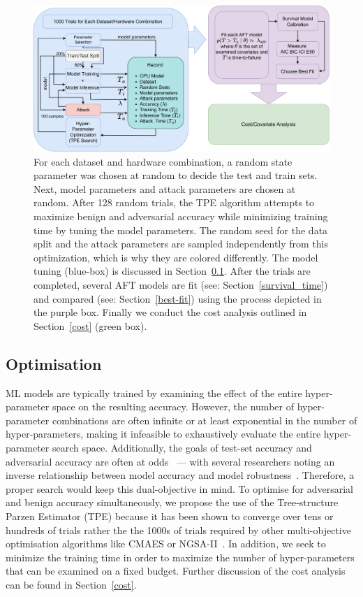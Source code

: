 \documentclass[conference]{IEEEtran}
\begin{document}
\begin{figure}
    \centering
    \includegraphics[width=\textwidth]{plots/experiment.pdf}
    \caption{For each dataset and hardware combination, a random state parameter was chosen at random to decide the test and train sets. Next, model parameters and attack parameters are chosen at random. After 128 random trials, the TPE algorithm attempts to maximize benign and adversarial accuracy while minimizing training time by tuning the model parameters. The random seed for the data split and the attack parameters are sampled independently from this optimization, which is why they are colored differently. The model tuning (blue-box) is discussed in Section~\ref{optimisation}. After the trials are completed, several AFT models are fit (see: Section~\ref{survival_time}) and compared (see: Section~\ref{best-fit}) using the process depicted in the purple box. Finally we conduct the cost analysis outlined in Section~\ref{cost} (green box).}
    \label{fig:experiments}
\end{figure}



\subsection{Optimisation}
\label{optimisation}

ML models are typically trained by examining the effect of the entire hyper-parameter space on the resulting accuracy. However, the number of hyper-parameter combinations are often infinite or at least exponential in the number of hyper-parameters,
making it infeasible to exhaustively evaluate the entire hyper-parameter search space. Additionally, the goals of test-set accuracy and adversarial accuracy are often at odds~\cite{carlini_towards_2017} --- with several researchers noting an inverse relationship between model accuracy and model robustness~\cite{carlini_towards_2017,meyers,dohmatob_generalized_2019}. Therefore, a proper search would keep this dual-objective in mind.
To optimise for adversarial and benign accuracy simultaneously, we propose the use of the Tree-structure Parzen Estimator (TPE) because it has been shown to converge  over tens or hundreds of trials rather the the 1000s of trials required by other multi-objective optimisation algorithms like CMAES or NGSA-II~\cite{ozaki2020multiobjective,optuna,tpe_params}. In addition, we seek to minimize the training time in order to maximize the number of hyper-parameters that can be examined on a fixed budget. Further discussion of the cost analysis can be found in Section~\ref{cost}.
\end{document}
